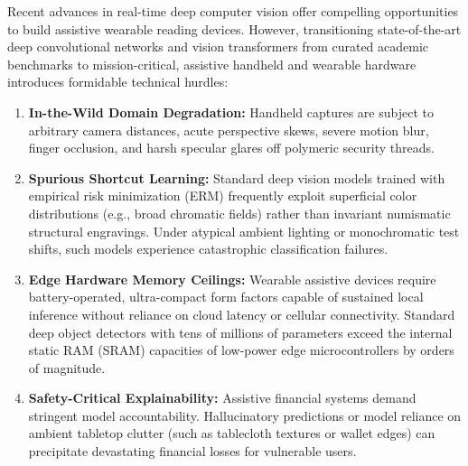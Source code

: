 \documentclass[conference]{IEEEtran}
\begin{document}
Recent advances in real-time deep computer vision offer compelling opportunities to build assistive wearable reading devices. However, transitioning state-of-the-art deep convolutional networks and vision transformers from curated academic benchmarks to mission-critical, assistive handheld and wearable hardware introduces formidable technical hurdles:
\begin{enumerate}
    \item \textbf{In-the-Wild Domain Degradation:} Handheld captures are subject to arbitrary camera distances, acute perspective skews, severe motion blur, finger occlusion, and harsh specular glares off polymeric security threads.
    \item \textbf{Spurious Shortcut Learning:} Standard deep vision models trained with empirical risk minimization (ERM) frequently exploit superficial color distributions (e.g., broad chromatic fields) rather than invariant numismatic structural engravings. Under atypical ambient lighting or monochromatic test shifts, such models experience catastrophic classification failures.
    \item \textbf{Edge Hardware Memory Ceilings:} Wearable assistive devices require battery-operated, ultra-compact form factors capable of sustained local inference without reliance on cloud latency or cellular connectivity. Standard deep object detectors with tens of millions of parameters exceed the internal static RAM (SRAM) capacities of low-power edge microcontrollers by orders of magnitude.
    \item \textbf{Safety-Critical Explainability:} Assistive financial systems demand stringent model accountability. Hallucinatory predictions or model reliance on ambient tabletop clutter (such as tablecloth textures or wallet edges) can precipitate devastating financial losses for vulnerable users.
\end{enumerate}
\end{document}
